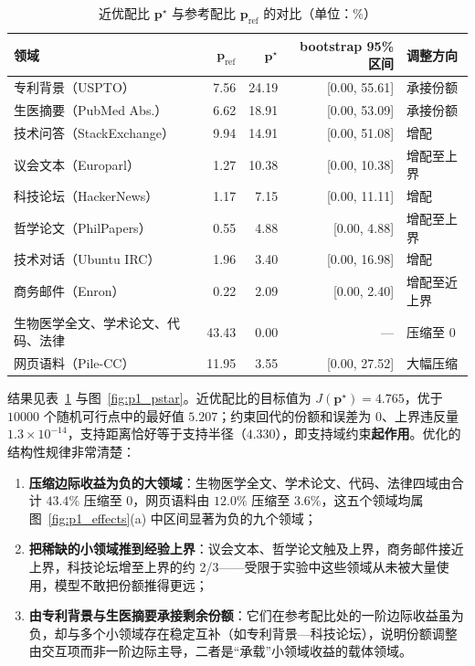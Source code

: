 \begin{table}[htbp]
\centering
\small
\caption{近优配比 $\boldsymbol p^\star$ 与参考配比 $\boldsymbol p_{\mathrm{ref}}$ 的对比（单位：\%）}
\label{tab:p1_pstar}
\begin{tabular}{lrrrl}
\toprule
领域 & $\boldsymbol p_{\mathrm{ref}}$ & $\boldsymbol p^\star$ & bootstrap 95\% 区间 & 调整方向 \\
\midrule
专利背景（USPTO） & 7.56 & 24.19 & [0.00, 55.61] & 承接份额 \\
生医摘要（PubMed Abs.） & 6.62 & 18.91 & [0.00, 53.09] & 承接份额 \\
技术问答（StackExchange） & 9.94 & 14.91 & [0.00, 51.08] & 增配 \\
议会文本（Europarl） & 1.27 & 10.38 & [0.00, 10.38] & 增配至上界 \\
科技论坛（HackerNews） & 1.17 & 7.15 & [0.00, 11.11] & 增配 \\
哲学论文（PhilPapers） & 0.55 & 4.88 & [0.00, 4.88] & 增配至上界 \\
技术对话（Ubuntu IRC） & 1.96 & 3.40 & [0.00, 16.98] & 增配 \\
商务邮件（Enron） & 0.22 & 2.09 & [0.00, 2.40] & 增配至近上界 \\
\midrule
生物医学全文、学术论文、代码、法律 & 43.43 & 0.00 & — & 压缩至 0 \\
网页语料（Pile-CC） & 11.95 & 3.55 & [0.00, 27.52] & 大幅压缩 \\
\bottomrule
\end{tabular}
\end{table}

结果见表~\ref{tab:p1_pstar} 与图~\ref{fig:p1_pstar}。近优配比的目标值为 $J(\boldsymbol p^\star)=4.765$，优于 $10000$ 个随机可行点中的最好值 $5.207$；约束回代的份额和误差为 $0$、上界违反量 $1.3\times10^{-14}$，支持距离恰好等于支持半径（$4.330$），即支持域约束\textbf{起作用}。优化的结构性规律非常清楚：

\begin{enumerate}
\item \textbf{压缩边际收益为负的大领域}：生物医学全文、学术论文、代码、法律四域由合计 $43.4\%$ 压缩至 0，网页语料由 $12.0\%$ 压缩至 $3.6\%$，这五个领域均属图~\ref{fig:p1_effects}(a) 中区间显著为负的九个领域；
\item \textbf{把稀缺的小领域推到经验上界}：议会文本、哲学论文触及上界，商务邮件接近上界，科技论坛增至上界的约 2/3——受限于实验中这些领域从未被大量使用，模型不敢把份额推得更远；
\item \textbf{由专利背景与生医摘要承接剩余份额}：它们在参考配比处的一阶边际收益虽为负，却与多个小领域存在稳定互补（如专利背景—科技论坛），说明份额调整由交互项而非一阶边际主导，二者是“承载”小领域收益的载体领域。
\end{enumerate}

